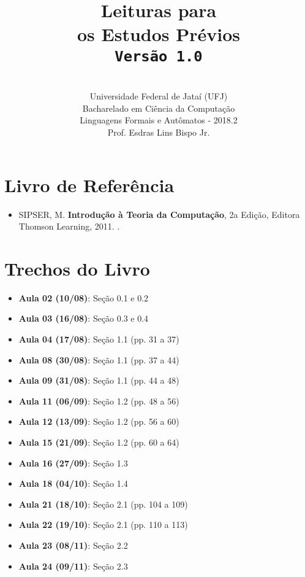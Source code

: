 \documentclass[12pt,a4paper,oneside]{article}
\author{\\Universidade Federal de Jataí (UFJ)\\Bacharelado em Ciência da Computação \\Linguagens Formais e Autômatos - 2018.2 \\Prof. Esdras Lins Bispo Jr.}
\date{}
\title{
	\sc \huge Leituras para \\os Estudos Prévios
	\\{\tt Versão 1.0}
}
\begin{document}
\maketitle

\section{Livro de Referência}
	\begin{itemize}
		\item SIPSER, M. {\bf Introdução à Teoria da Computação}, 2a Edição, Editora Thomson Learning, 2011. \color{blue}{\bf Código Bib.: [004 SIP/int]}.
	\end{itemize}
	
\section{Trechos do Livro}

\begin{itemize}
	
	\item[] {\bf Aula 02 (10/08)}: Seção 0.1 e 0.2
	\item[] {\bf Aula 03 (16/08)}: Seção 0.3 e 0.4
	\item[] {\bf Aula 04 (17/08)}: Seção 1.1 (pp. 31 a 37)
	\item[] {\bf Aula 08 (30/08)}: Seção 1.1 (pp. 37 a 44)
	\item[] {\bf Aula 09 (31/08)}: Seção 1.1 (pp. 44 a 48)
	\item[] {\bf Aula 11 (06/09)}: Seção 1.2 (pp. 48 a 56)
	\item[] {\bf Aula 12 (13/09)}: Seção 1.2 (pp. 56 a 60)
	\item[] {\bf Aula 15 (21/09)}: Seção 1.2 (pp. 60 a 64)
	\item[] {\bf Aula 16 (27/09)}: Seção 1.3
	\item[] {\bf Aula 18 (04/10)}: Seção 1.4
	\item[] {\bf Aula 21 (18/10)}: Seção 2.1 (pp. 104 a 109)
	\item[] {\bf Aula 22 (19/10)}: Seção 2.1 (pp. 110 a 113)
	\item[] {\bf Aula 23 (08/11)}: Seção 2.2
	\item[] {\bf Aula 24 (09/11)}: Seção 2.3
	
\end{itemize}
\end{document}
